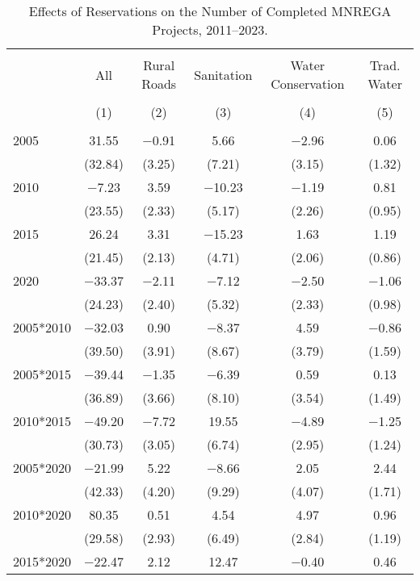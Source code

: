 \begin{table}[!htbp]
\centering
\begin{threeparttable}

  \caption{Effects of Reservations on the Number of Completed MNREGA Projects, 2011--2023.} 
  \label{main_mnrega_2011_2023_all} 
\scriptsize 
\begin{tabular}{@{\extracolsep{0pt}}lccccc} 
\\[-1.8ex]\hline 
\hline \\[-1.8ex] 
 & All & Rural Roads & Sanitation & Water Conservation & Trad. Water \\ 
\\[-1.8ex] & (1) & (2) & (3) & (4) & (5)\\ 
\hline \\[-1.8ex] 
 2005 & 31.55 & $-$0.91 & 5.66 & $-$2.96 & 0.06 \\ 
  & (32.84) & (3.25) & (7.21) & (3.15) & (1.32) \\ 
  2010 & $-$7.23 & 3.59 & $-$10.23 & $-$1.19 & 0.81 \\ 
  & (23.55) & (2.33) & (5.17) & (2.26) & (0.95) \\ 
  2015 & 26.24 & 3.31 & $-$15.23 & 1.63 & 1.19 \\ 
  & (21.45) & (2.13) & (4.71) & (2.06) & (0.86) \\ 
  2020 & $-$33.37 & $-$2.11 & $-$7.12 & $-$2.50 & $-$1.06 \\ 
  & (24.23) & (2.40) & (5.32) & (2.33) & (0.98) \\ 
  2005*2010 & $-$32.03 & 0.90 & $-$8.37 & 4.59 & $-$0.86 \\ 
  & (39.50) & (3.91) & (8.67) & (3.79) & (1.59) \\ 
  2005*2015 & $-$39.44 & $-$1.35 & $-$6.39 & 0.59 & 0.13 \\ 
  & (36.89) & (3.66) & (8.10) & (3.54) & (1.49) \\ 
  2010*2015 & $-$49.20 & $-$7.72 & 19.55 & $-$4.89 & $-$1.25 \\ 
  & (30.73) & (3.05) & (6.74) & (2.95) & (1.24) \\ 
  2005*2020 & $-$21.99 & 5.22 & $-$8.66 & 2.05 & 2.44 \\ 
  & (42.33) & (4.20) & (9.29) & (4.07) & (1.71) \\ 
  2010*2020 & 80.35 & 0.51 & 4.54 & 4.97 & 0.96 \\ 
  & (29.58) & (2.93) & (6.49) & (2.84) & (1.19) \\ 
  2015*2020 & $-$22.47 & 2.12 & 12.47 & $-$0.40 & 0.46 \\ 

\end{tabular}
\end{threeparttable}
\end{table}
